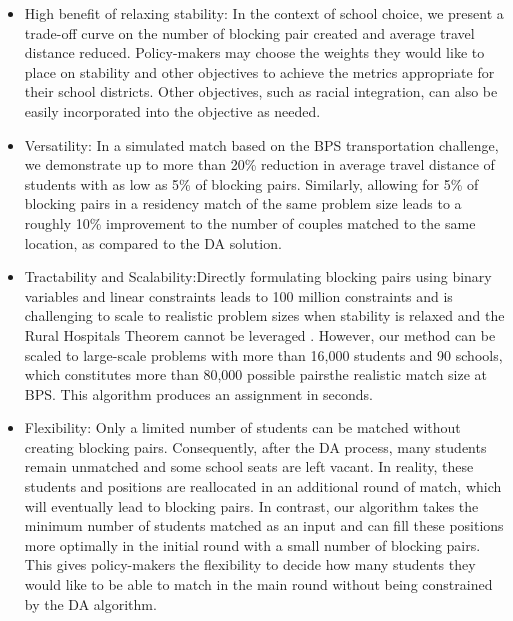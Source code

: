 \documentclass[11pt]{article}
\begin{document}
\begin{itemize}
    \item {High benefit of relaxing stability:} In the context of school choice, we present a trade-off curve on the number of blocking pair created and average travel distance reduced. Policy-makers may choose the weights they would like to place on stability and other objectives to achieve the metrics appropriate for their school districts. Other objectives, such as racial integration, can also be easily incorporated into the objective as needed.  
    \item {{Versatility:}} In a simulated match based on the BPS transportation challenge, we demonstrate up to more than 20\% reduction in average travel distance of students with as low as 5\% of blocking pairs. Similarly, allowing for 5\% of blocking pairs in a residency match of the same problem size leads to a roughly 10\% improvement to the number of couples matched to the same location, as compared to the DA solution.
    \item {{Tractability and Scalability:}}Directly formulating blocking pairs using binary variables and linear constraints leads to 100 million constraints and is challenging to scale to realistic problem sizes when stability is relaxed and the Rural Hospitals Theorem cannot be leveraged \citep{papalexopoulos2022}. However, our method can be scaled to large-scale problems with more than 16,000 students and 90 schools, which constitutes more than 80,000 possible pairs\textemdash the realistic match size at BPS. This algorithm produces an assignment in seconds. 
    \item {{Flexibility:}} Only a limited number of students can be matched without creating blocking pairs. Consequently, after the DA process, many students remain unmatched and some school seats are left vacant.
    In reality, these students and positions are reallocated in an additional round of match, which will eventually lead to blocking pairs. In contrast, our algorithm takes the minimum number of students matched as an input and can fill these positions more optimally in the initial round with a small number of blocking pairs. This gives policy-makers the flexibility to decide how many students they would like to be able to match in the main round without being constrained by the DA algorithm. 
\end{itemize}
\end{document}
